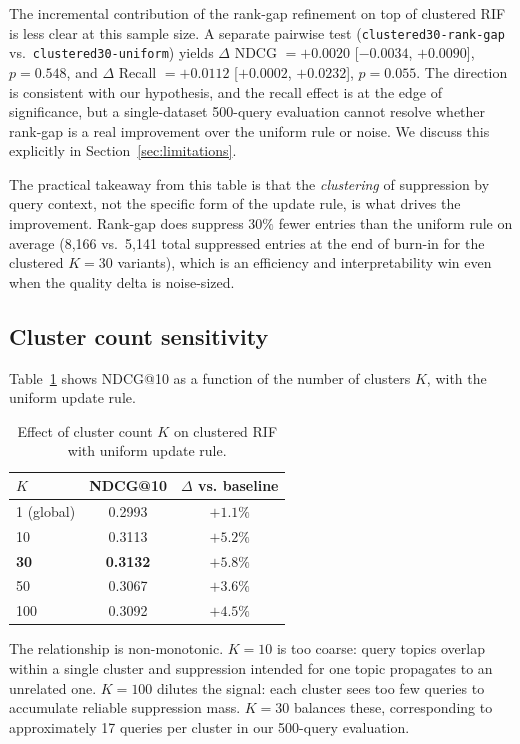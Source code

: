 \documentclass[11pt,a4paper]{article}
\begin{document}
The incremental contribution of the rank-gap refinement on top of clustered RIF is less clear at this sample size. A separate pairwise test (\texttt{clustered30-rank-gap} vs.\ \texttt{clustered30-uniform}) yields $\Delta$ NDCG $= +0.0020$ [$-0.0034$, $+0.0090$], $p = 0.548$, and $\Delta$ Recall $= +0.0112$ [$+0.0002$, $+0.0232$], $p = 0.055$. The direction is consistent with our hypothesis, and the recall effect is at the edge of significance, but a single-dataset 500-query evaluation cannot resolve whether rank-gap is a real improvement over the uniform rule or noise. We discuss this explicitly in Section~\ref{sec:limitations}.

The practical takeaway from this table is that the \emph{clustering} of suppression by query context, not the specific form of the update rule, is what drives the improvement. Rank-gap does suppress $30\%$ fewer entries than the uniform rule on average (8,166 vs.\ 5,141 total suppressed entries at the end of burn-in for the clustered $K=30$ variants), which is an efficiency and interpretability win even when the quality delta is noise-sized.

\subsection{Cluster count sensitivity}

Table~\ref{tab:cluster-sweep} shows NDCG@10 as a function of the number of clusters $K$, with the uniform update rule.

\begin{table}[ht]
\centering
\caption{Effect of cluster count $K$ on clustered RIF with uniform update rule.}
\label{tab:cluster-sweep}
\begin{tabular}{lcc}
\toprule
$K$ & NDCG@10 & $\Delta$ vs. baseline \\
\midrule
1 (global) & 0.2993 & $+1.1\%$ \\
10 & 0.3113 & $+5.2\%$ \\
\textbf{30} & \textbf{0.3132} & $\mathbf{+5.8\%}$ \\
50 & 0.3067 & $+3.6\%$ \\
100 & 0.3092 & $+4.5\%$ \\
\bottomrule
\end{tabular}
\end{table}

The relationship is non-monotonic. $K=10$ is too coarse: query topics overlap within a single cluster and suppression intended for one topic propagates to an unrelated one. $K=100$ dilutes the signal: each cluster sees too few queries to accumulate reliable suppression mass. $K=30$ balances these, corresponding to approximately 17 queries per cluster in our 500-query evaluation.
\end{document}
